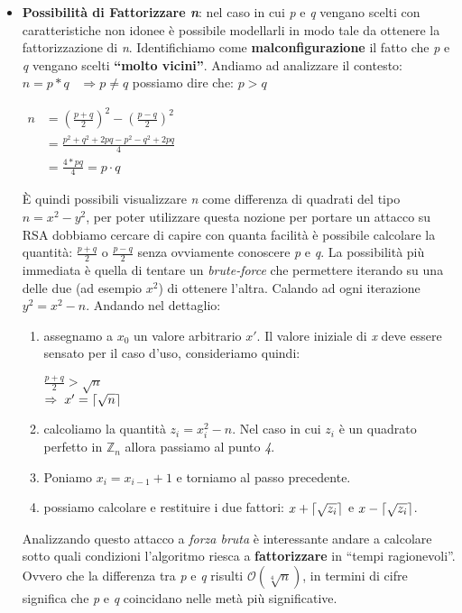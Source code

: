 \begin{itemize}
    \item \textbf{Possibilità di Fattorizzare \textit{n}}: nel caso in cui \textit{p} e \textit{q} vengano scelti con caratteristiche non idonee è possibile modellarli in modo tale da ottenere la fattorizzazione di \textit{n}. Identifichiamo come \textbf{malconfigurazione} il fatto che \textit{p} e \textit{q} vengano scelti \textbf{``molto vicini''}. Andiamo ad analizzare il contesto:
    \\
    $n = p * q \;\;\; \Rightarrow p \neq q$ possiamo dire che: $p > q$ \\
    \begin{center}
        \begin{math}
            \begin{aligned}
                n &= (\frac{p + q}{2})^2 - (\frac{p - q}{2})^2 \\
                &= \frac{p^2 + q^2 + 2pq - p^2 -q^2 + 2pq}{4} \\
                &= \frac{4 * pq}{4} = p \cdot q
            \end{aligned}
        \end{math}
    \end{center}
    È quindi possibili visualizzare \textit{n} come differenza di quadrati del tipo $n = x^2 -y^2$, per poter utilizzare questa nozione per portare un attacco su RSA dobbiamo cercare di capire con quanta facilità è possibile calcolare la quantità: $\frac{p + q}{2}$ o $\frac{p - q}{2}$ senza ovviamente conoscere \textit{p} e \textit{q}. La possibilità più immediata è quella di tentare un \textit{brute-force} che permettere iterando su una delle due (ad esempio $x^2$) di ottenere l'altra. Calando ad ogni iterazione $y^2 = x^2 -n$. Andando nel dettaglio:
    \begin{enumerate}
        \item assegnamo a $x_0$ un valore arbitrario $x'$. Il valore iniziale di \textit{x} deve essere sensato per il caso d'uso, consideriamo quindi:
        \begin{center}
            $\frac{p + q}{2} > \sqrt{n}$ \\
            $\Rightarrow \; x' = \lceil\sqrt{n}\rceil$
        \end{center}
        \item calcoliamo la quantità $z_i = x_i^2 - n$. Nel caso in cui $z_i$ è un quadrato perfetto in $\mathbb{Z}_n$ allora passiamo al punto \textit{4}.
        \item Poniamo $x_i = x_{i - 1} + 1$ e torniamo al passo precedente.
        \item possiamo calcolare e restituire i due fattori: $x + \lceil\sqrt{z_i}\rceil$ e $x - \lceil\sqrt{z_i}\rceil$.
    \end{enumerate}
    Analizzando questo attacco a \textit{forza bruta} è interessante andare a calcolare sotto quali condizioni l'algoritmo riesca a \textbf{fattorizzare} in ``tempi ragionevoli''. Ovvero che la differenza tra \textit{p} e \textit{q} risulti $\mathcal{O}(\sqrt[4]{n})$, in termini di cifre significa che \textit{p} e \textit{q} coincidano nelle metà più significative.


\end{itemize}
